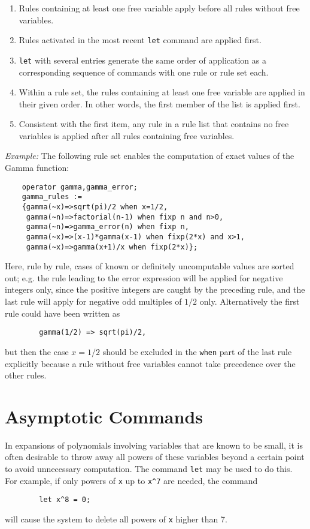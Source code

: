 \begin{enumerate}
\item Rules containing at least one free variable apply before all rules
without free variables.
\item Rules activated in the most recent \texttt{let}
command are applied first.
\item \texttt{let} with several entries generate
the same order of application as a corresponding sequence of commands with
one rule or rule set each.
\item Within a rule set, the rules containing at least
one free variable are applied in their given order.
In other words, the first member of the list is applied first.
\item Consistent with the first item, any rule in a rule list that
contains no free variables is applied after all rules containing free
variables.
\end{enumerate}
\textit{Example:} The following rule set enables the computation of exact
values of the Gamma function:
\begin{verbatim}
    operator gamma,gamma_error;
    gamma_rules :=
    {gamma(~x)=>sqrt(pi)/2 when x=1/2,
     gamma(~n)=>factorial(n-1) when fixp n and n>0,
     gamma(~n)=>gamma_error(n) when fixp n,
     gamma(~x)=>(x-1)*gamma(x-1) when fixp(2*x) and x>1,
     gamma(~x)=>gamma(x+1)/x when fixp(2*x)};
\end{verbatim}
Here, rule by rule, cases of known or definitely uncomputable values
are sorted out; e.g. the rule leading to the error expression
will be applied for negative integers only, since the positive
integers are caught by the preceding rule, and the
last rule will apply for negative odd multiples of $1/2$ only.
Alternatively the first rule could have been written as
\begin{verbatim}
        gamma(1/2) => sqrt(pi)/2,
\end{verbatim}
but then the case $x=1/2$ should be excluded in the \texttt{when} part of the
last rule explicitly because a rule without free variables cannot take
precedence over the other rules.

\section{Asymptotic Commands} 
\label{sec-asymp}
In expansions of polynomials involving variables that are known to be
small, it is often desirable to throw away all powers of these variables
beyond a certain point to avoid unnecessary computation.  The command 
\texttt{let} may be used to do this.  For example, if only powers of \texttt{x} up to
\texttt{x\textasciicircum 7} are needed, the command
\begin{verbatim}
        let x^8 = 0;
\end{verbatim}
will cause the system to delete all powers of \texttt{x} higher than 7.


